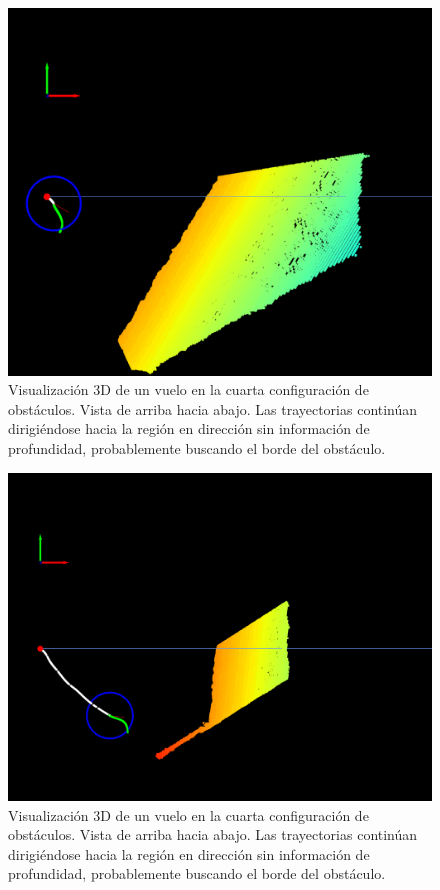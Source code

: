\begin{figure}[H]
    \centering
    \includegraphics[scale=0.25]{partes/img/depth-wall-3-try-arround.png}
    \caption[Visualización 3D de un vuelo en la cuarta configuración de obstáculos. Vista de arriba hacia abajo. Búsqueda del borde del obstáculo (2).]{Visualización 3D de un vuelo en la cuarta configuración de obstáculos. Vista de arriba hacia abajo. Las trayectorias continúan dirigiéndose hacia la región en dirección  sin información de profundidad, probablemente buscando el borde del obstáculo.}
    \label{depth-wall-3}
\end{figure}

\begin{figure}[H]
    \centering
    \includegraphics[scale=0.25]{partes/img/depth-wall-4-still-go-arround.png}
    \caption[Visualización 3D de un vuelo en la cuarta configuración de obstáculos. Vista de arriba hacia abajo. Búsqueda del borde del obstáculo (3).]{Visualización 3D de un vuelo en la cuarta configuración de obstáculos. Vista de arriba hacia abajo. Las trayectorias continúan dirigiéndose hacia la región en dirección  sin información de profundidad, probablemente buscando el borde del obstáculo.}
    \label{depth-wall-4}
\end{figure}

